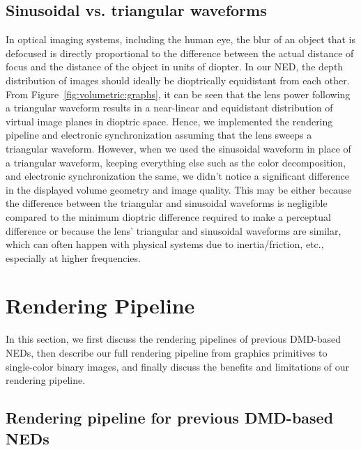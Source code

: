 \subsection{Sinusoidal vs. triangular waveforms}
\label{sec:volumetric:sinusoidal_vs_triangular}
In optical imaging systems, including the human eye, the blur of an object that is defocused is directly proportional to the difference between the actual distance of focus and the distance of the object in units of diopter. In our NED, the depth distribution of images should ideally be dioptrically equidistant from each other. From Figure~\ref{fig:volumetric:graphs}, it can be seen that the lens power following a triangular waveform results in a near-linear and equidistant distribution of virtual image planes in dioptric space. Hence, we implemented the rendering pipeline and electronic synchronization assuming that the lens sweeps a triangular waveform. However, when we used the sinusoidal waveform in place of a triangular waveform, keeping everything else such as the color decomposition, and electronic synchronization the same, we didn't notice a significant difference in the displayed volume geometry and image quality. This may be either because the difference between the triangular and sinusoidal waveforms is negligible compared to the minimum dioptric difference required to make a perceptual difference or because the lens' triangular and sinusoidal waveforms are similar, which can often happen with physical systems due to inertia/friction, etc., especially at higher frequencies.

\section{Rendering Pipeline}
\label{sec:volumetric:rendering_pipeline}
In this section, we first discuss the rendering pipelines of previous DMD-based NEDs, then describe our full rendering pipeline from graphics primitives to single-color binary images, and finally discuss the benefits and limitations of our rendering pipeline.

\subsection{Rendering pipeline for previous DMD-based NEDs}
\label{sec:volumetric:previous_rendering_pipeline}



